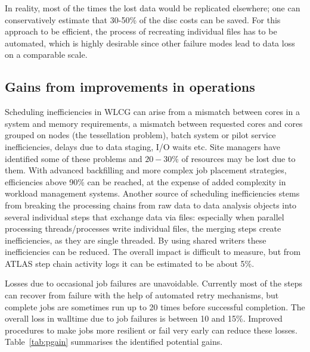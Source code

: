 In reality, most of the times the lost data would be replicated
elsewhere; one can conservatively estimate that 30-50\% of the disc
costs can be saved. For this approach to be efficient, the process of
recreating individual files has to be automated, which is highly
desirable since other failure modes lead to data loss on a comparable
scale.

\subsection{Gains from improvements in operations}
Scheduling inefficiencies in WLCG can arise from a mismatch between
cores in a system and memory requirements, a mismatch between
requested cores and cores grouped on nodes (the tessellation problem),
batch system or pilot service inefficiencies, delays due to data
staging, I/O waits etc. Site managers have identified some of these
problems and $20-30\%$ of resources may be lost due to them. With
advanced backfilling and more complex job placement strategies,
efficiencies above 90\% can be reached, at the expense of added
complexity in workload management systems. Another source of
scheduling inefficiencies stems from breaking the processing chains
from raw data to data analysis objects into several individual steps
that exchange data via files: especially when parallel processing
threads/processes write individual files, the merging steps create
inefficiencies, as they are single threaded. By using shared writers
these inefficiencies can be reduced. The overall impact is difficult
to measure, but from ATLAS step chain activity logs it can be
estimated to be about 5\%.

Losses due to occasional job failures are unavoidable. Currently most
of the steps can recover from failure with the help of automated retry
mechanisms, but complete jobs are sometimes run up to 20 times before
successful completion. The overall loss in walltime due to job
failures is between 10 and 15\%. Improved procedures to make jobs more
resilient or fail very early can reduce these losses.
Table~\ref{tab:pgain} summarises the identified potential gains.

